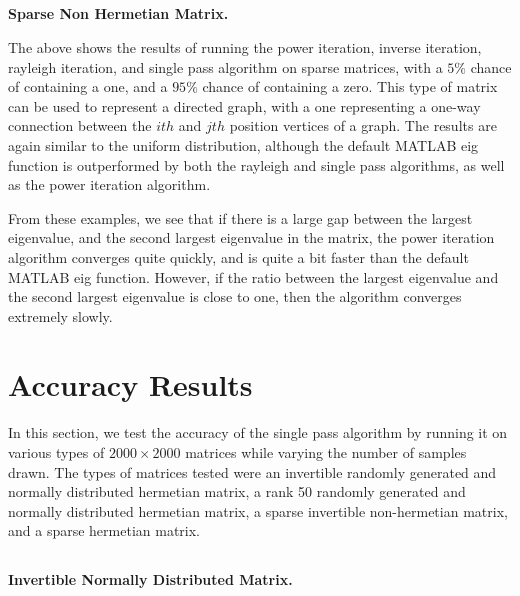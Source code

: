 \documentclass[11pt]{amsart}
\begin{document}
\subsection{} \textbf{Sparse Non Hermetian Matrix.}

\begin{center}
\end{center}

The above shows the results of running the power iteration, inverse iteration, rayleigh iteration, and single pass algorithm on sparse matrices, with a $5\%$ chance of containing a one, and a $95\%$ chance of containing a zero. This type of matrix can be used to represent a directed graph, with a one representing a one-way connection between the $ith$ and $jth$ position vertices of a graph. The results are again similar to the uniform distribution, although the default MATLAB eig function is outperformed by both the rayleigh and single pass algorithms, as well as the power iteration algorithm.

\begin{center}
\end{center}

From these examples, we see that if there is a large gap between the largest eigenvalue, and the second largest eigenvalue in the matrix, the power iteration algorithm converges quite quickly, and is quite a bit faster than the default MATLAB eig function. However, if the ratio between the largest eigenvalue and the second largest eigenvalue is close to one, then the algorithm converges extremely slowly.

\section{Accuracy Results}
In this section, we test the accuracy of the single pass algorithm by running it on various types of $2000 \times 2000$ matrices while varying the number of samples drawn. The types of matrices tested were an invertible randomly generated and normally distributed hermetian matrix, a rank 50 randomly generated and normally distributed hermetian matrix, a sparse invertible non-hermetian matrix, and a sparse hermetian matrix. 

\subsection{}\textbf{Invertible Normally Distributed Matrix.}
\end{document}
